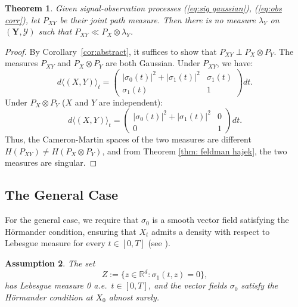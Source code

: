 \documentclass[12pt]{amsart}
\newtheorem{theorem}{Theorem}[section]
\newtheorem{assumption}[theorem]{Assumption}
\theoremstyle{definition}
\theoremstyle{remark}
\newcommand{\ms}[1]{(\mathbf{#1},\mathcal{#1})}
\begin{document}
\begin{theorem}
    Given signal-observation processes (\ref{eq:sig gaussian}), (\ref{eq:obs corr}), let $P_{XY}$ be their joint path measure. Then there is no measure $\lambda_Y$ on $\ms{Y}$ such that $P_{XY}\ll P_X\otimes \lambda_Y$.
\end{theorem}
\begin{proof}
    By Corollary~\ref{cor:abstract}, it suffices to show that $P_{XY} \perp P_X \otimes P_Y$. The measures $P_{XY}$ and $P_X \otimes P_Y$ are both Gaussian. Under $P_{XY}$, we have:
    \begin{equation}
        d\langle (X,Y)\rangle_t = \begin{pmatrix}
            |\sigma_0(t)|^2+|\sigma_1(t)|^2 & \sigma_1(t)\\
            \sigma_1(t) & 1
        \end{pmatrix}dt.
    \end{equation}
    Under $P_{X}\otimes P_Y$ ($X$ and $Y$ are independent):
    \begin{equation}
        d\langle (X,Y)\rangle_t = \begin{pmatrix}
            |\sigma_0(t)|^2+|\sigma_1(t)|^2 & 0\\
            0 & 1
        \end{pmatrix}dt.
    \end{equation}
    Thus, the Cameron-Martin spaces of the two measures are different $H(P_{XY})\neq H(P_X\otimes P_Y)$, and from Theorem \ref{thm: feldman hajek}, the two measures are singular.
\end{proof}

\subsection{The General Case}

For the general case, we require that $\sigma_0$ is a smooth vector field satisfying the H\"ormander condition, ensuring that $X_t$ admits a density with respect to Lebesgue measure for every $t \in [0,T]$ (see \cite[Section 4.1.2]{geng2021introduction}).

\begin{assumption}\label{as:hordmander's condition}
    The set
    \[
    Z := \{z \in \mathbb R^d: \sigma_1(t,z)=0\},
    \]
    has Lebesgue measure 0 a.e.\ $t\in[0,T]$, and the vector fields $\sigma_0$ satisfy the H\"ormander condition at $X_0$ almost surely.
\end{assumption}
\end{document}
